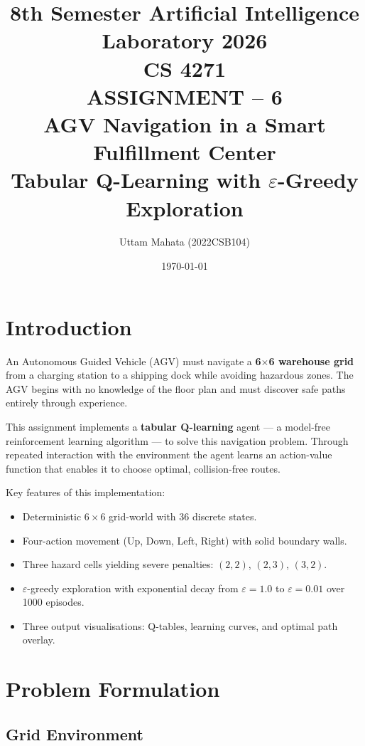 \documentclass[12pt]{article}
\title{%
    \large 8th Semester Artificial Intelligence Laboratory 2026 \\[4pt]
    \large CS 4271 \\[10pt]
    \textbf{\LARGE ASSIGNMENT -- 6} \\[8pt]
    \textbf{\Large AGV Navigation in a Smart Fulfillment Center} \\[4pt]
    \large Tabular Q-Learning with $\varepsilon$-Greedy Exploration
}
\author{Uttam Mahata (2022CSB104)}
\date{\today}
\begin{document}
\maketitle
\tableofcontents
\newpage

\section{Introduction}

An Autonomous Guided Vehicle (AGV) must navigate a \textbf{6$\times$6 warehouse
grid} from a charging station to a shipping dock while avoiding hazardous zones.
The AGV begins with no knowledge of the floor plan and must discover safe paths
entirely through experience.

This assignment implements a \textbf{tabular Q-learning} agent --- a
model-free reinforcement learning algorithm --- to solve this navigation
problem. Through repeated interaction with the environment the agent learns an
action-value function that enables it to choose optimal, collision-free routes.

Key features of this implementation:
\begin{itemize}
    \item Deterministic $6 \times 6$ grid-world with 36 discrete states.
    \item Four-action movement (Up, Down, Left, Right) with solid boundary walls.
    \item Three hazard cells yielding severe penalties: $(2,2)$, $(2,3)$, $(3,2)$.
    \item $\varepsilon$-greedy exploration with exponential decay from
          $\varepsilon = 1.0$ to $\varepsilon = 0.01$ over 1000 episodes.
    \item Three output visualisations: Q-tables, learning curves, and optimal
          path overlay.
\end{itemize}

\section{Problem Formulation}

\subsection{Grid Environment}
\end{document}
